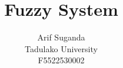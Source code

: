 \documentclass[12pt,a4paper]{article}
\title{Fuzzy System}
\author{Arif Suganda\\
        Tadulako University\\
        F5522530002}
\begin{document}
\maketitle








\printbibliography{}
\end{document}
